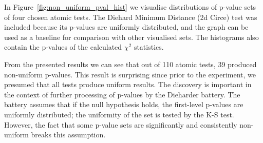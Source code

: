 \documentclass[
	digital,    %
	oneside,    %
	color,
	11pt,
	nocover,
	notable,
	nolof,
	nolot,
]{fithesis3}
\theoremstyle{definition}
\theoremstyle{remark}
\begin{document}
In Figure~\ref{fig:non_uniform_pval_hist} we visualise distributions of p-value sets of four chosen atomic tests. The Diehard Minimum Distance (2d Circe) test was included because its p-values are uniformly distributed, and the graph can be used as a baseline for comparison with other visualised sets. The histograms also contain the p-values of the calculated $\chi^2$ statistics.

From the presented results we can see that out of 110 atomic tests, 39 produced non-uniform p-values. This result is surprising since prior to the experiment, we presumed that all tests produce uniform results. The discovery is important in the context of further processing of p-values by the Dieharder battery. The battery assumes that if the null hypothesis holds, the first-level p-values are uniformly distributed; the uniformity of the set is tested by the K-S test. However, the fact that some p-value sets are significantly and consistently non-uniform breaks this assumption.
\end{document}
